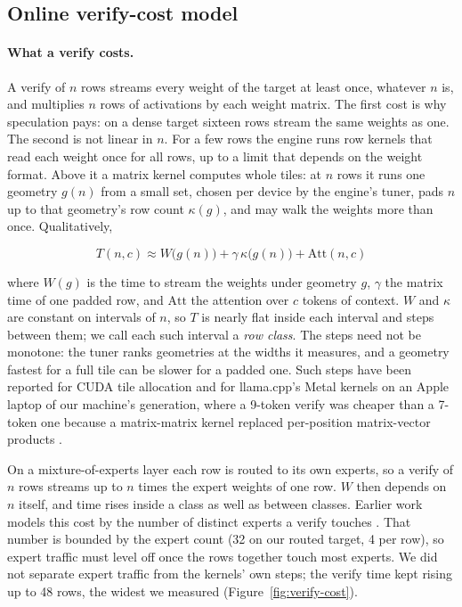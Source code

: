 \documentclass[10pt,twocolumn,letterpaper]{article}
\begin{document}
\subsection{Online verify-cost model}\label{sec:3.2}

\paragraph{What a verify costs.} A verify of $n$ rows streams every weight of the target at least once, whatever $n$ is, and multiplies $n$ rows of activations by each weight matrix. The first cost is why speculation pays: on a dense target sixteen rows stream the same weights as one. The second is not linear in $n$. For a few rows the engine runs row kernels that read each weight once for all rows, up to a limit that depends on the weight format. Above it a matrix kernel computes whole tiles: at $n$ rows it runs one geometry $g(n)$ from a small set, chosen per device by the engine's tuner, pads $n$ up to that geometry's row count $\kappa(g)$, and may walk the weights more than once. Qualitatively,

\begin{equation}\label{eq:2}
T(n, c) \approx W\bigl(g(n)\bigr) + \gamma\,\kappa\bigl(g(n)\bigr) + \mathrm{Att}(n, c)
\end{equation}

where $W(g)$ is the time to stream the weights under geometry $g$, $\gamma$ the matrix time of one padded row, and $\mathrm{Att}$ the attention over $c$ tokens of context. $W$ and $\kappa$ are constant on intervals of $n$, so $T$ is nearly flat inside each interval and steps between them; we call each such interval a \emph{row class}. The steps need not be monotone: the tuner ranks geometries at the widths it measures, and a geometry fastest for a full tile can be slower for a padded one. Such steps have been reported for CUDA tile allocation \cite{cheng2026dspark,oh2026bastion} and for llama.cpp's Metal kernels on an Apple laptop of our machine's generation, where a 9-token verify was cheaper than a 7-token one because a matrix-matrix kernel replaced per-position matrix-vector products \cite{chordiya2026lossless}.

On a mixture-of-experts layer each row is routed to its own experts, so a verify of $n$ rows streams up to $n$ times the expert weights of one row. $W$ then depends on $n$ itself, and time rises inside a class as well as between classes. Earlier work models this cost by the number of distinct experts a verify touches \cite{pan2026making,saxena2025utility,huang2025moesd,mcdanel2026moe}. That number is bounded by the expert count (32 on our routed target, 4 per row), so expert traffic must level off once the rows together touch most experts. We did not separate expert traffic from the kernels' own steps; the verify time kept rising up to 48 rows, the widest we measured (Figure~\ref{fig:verify-cost}).
\end{document}
